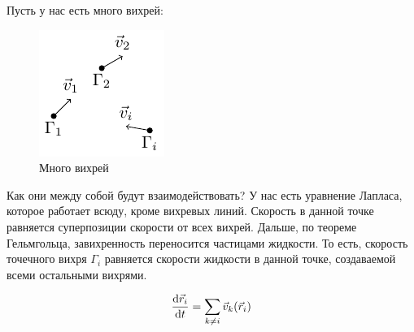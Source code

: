 Пусть у нас есть много вихрей: 
\begin{figure}[H]
    \centering
    \includegraphics[scale=1.5]{img/vihri}
    \caption{Много вихрей}
    \label{fig:vihri}
\end{figure}
Как они между собой будут взаимодействовать? У нас есть уравнение Лапласа, которое работает всюду, кроме вихревых линий. Скорость в данной точке равняется суперпозиции скорости от всех вихрей. Дальше, по теореме Гельмгольца, завихренность переносится частицами жидкости. То есть, скорость точечного вихря $\Gamma_i$ равняется скорости жидкости в данной точке, создаваемой всеми остальными вихрями. 

\begin{equation}
	\dv{\vec{r}_i}{t}=\sum\limits_{k\ne i} \vec{v}_k (\vec{r}_i)
\end{equation}

